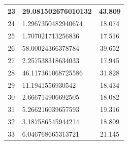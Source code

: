 \documentclass[a4paper, 11pt]{article}
\begin{document}
\begin{center}
\begin{tabular}{|c|l|c|}
		23       & 29.081502676010132  & 43.809       \\ \hline
		24       & 1.2967350482940674  & 18.074       \\ \hline
		25       & 1.707021713256836   & 17.516       \\ \hline
		26       & 58.00024366378784   & 39.652       \\ \hline
		27       & 2.257538318634033   & 17.945       \\ \hline
		28       & 46.117361068725586  & 31.828       \\ \hline
		29       & 11.1941556930542    & 18.434       \\ \hline
		30       & 2.666714906692505   & 18.082       \\ \hline
		31       & 5.266216039657593   & 19.316       \\ \hline
		32       & 3.187586545944214   & 18.809       \\ \hline
		33       & 6.046768665313721   & 21.145       \\ \hline
	\end{tabular}
\end{center}
\end{document}
